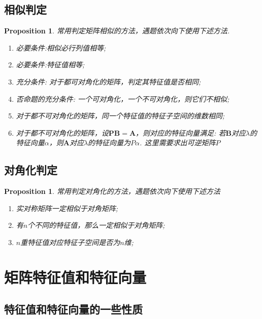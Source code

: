 \documentclass{article}
\newtheorem{proposition}[theorem]{Proposition}
\newcommand{\mbf}[1]{\bm{#1}}
\begin{document}
\subsection{相似判定}

\begin{proposition}
\rm 常用判定矩阵相似的方法，遇题依次向下使用下述方法.
\begin{enumerate}
	\item 必要条件:相似必行列值相等;
	\item 必要条件:特征值相等;
	\item 充分条件: 对于都可对角化的矩阵，判定其特征值是否相同;
	\item 否命题的充分条件: 一个可对角化，一个不可对角化，则它们不相似;
	\item 对于都不可对角化的矩阵，同一个特征值的特征子空间的维数相同;	
	\item 对于都不可对角化的矩阵，设$\mbf{P}\mbf{B} = \mbf{A}$，则对应的特征向量满足: 若$\mbf{B}$对应$\lambda$的特征向量$\alpha$，则$\mbf{A}$对应$\lambda$的特征向量为$P\alpha$. 这里需要求出可逆矩阵$P$
\end{enumerate}
\end{proposition}


\subsection{对角化判定}

\begin{proposition}
\rm 常用判定对角化的方法，遇题依次向下使用下述方法
\begin{enumerate}
	\item 实对称矩阵一定相似于对角矩阵;	
	\item 有$n$个不同的特征值，那么一定相似于对角矩阵;
	\item $n$重特征值对应特征子空间是否为$n$维;
\end{enumerate}
\end{proposition}

\newpage
\section{矩阵特征值和特征向量}

\subsection{特征值和特征向量的一些性质}
\end{document}
